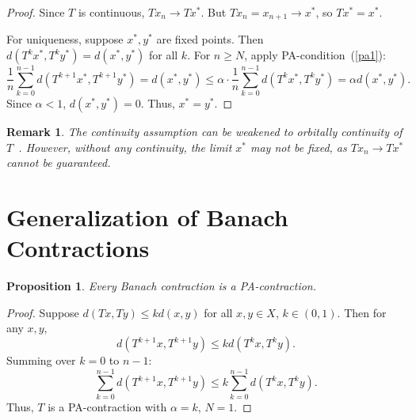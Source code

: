 \documentclass[11pt]{article}
\newtheorem{proposition}[theorem]{Proposition}
\newtheorem{remark}[theorem]{Remark}
\begin{document}
\begin{proof}
Since $ T $ is continuous, $ T x_n \to T x^* $. But $ T x_n = x_{n+1} \to x^* $, so $ T x^* = x^* $.

For uniqueness, suppose $ x^*, y^* $ are fixed points. Then $ d(T^k x^*, T^k y^*) = d(x^*, y^*) $ for all $ k $. For $n \ge N$, apply PA-condition~(\ref{pa1}):
\begin{equation}
\frac{1}{n} \sum_{k=0}^{n-1} d(T^{k+1}x^*, T^{k+1}y^*) = d(x^*, y^*) \leq \alpha \cdot \frac{1}{n} \sum_{k=0}^{n-1} d(T^k x^*, T^k y^*) = \alpha d(x^*, y^*).
\end{equation}
Since $ \alpha < 1 $, $ d(x^*, y^*) = 0 $. Thus, $ x^* = y^* $.
\end{proof}

\begin{remark}
The continuity assumption can be weakened to \textit{orbitally continuity} 
of $ T $~\cite{Ciricorbit,pantorbit}. However, without any continuity, the limit $ x^* $ may not be fixed, as $ T x_n \to T x^* $ cannot be guaranteed.
\end{remark}

\section{Generalization of Banach Contractions}

\begin{proposition}
Every Banach contraction is a PA-contraction.
\end{proposition}

\begin{proof}
Suppose $ d(Tx, Ty) \leq k d(x,y) $ for all $ x,y \in X $, $ k \in (0,1) $. Then for any $ x,y $,
\begin{equation}
d(T^{k+1}x, T^{k+1}y) \leq k d(T^k x, T^k y).
\end{equation}
Summing over $ k = 0 $ to $ n-1 $:
\begin{equation}
\sum_{k=0}^{n-1} d(T^{k+1}x, T^{k+1}y) \leq k \sum_{k=0}^{n-1} d(T^k x, T^k y).
\end{equation}
Thus, $ T $ is a PA-contraction with $ \alpha = k $, $N=1$.
\end{proof}
\end{document}
